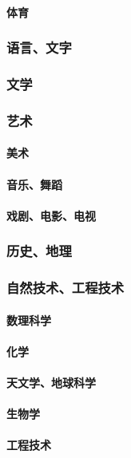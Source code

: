 \documentclass[UTF8]{../RepresentationUniverse}
\begin{document}
            \paragraph{体育}
        \subsubsection{语言、文字}
        \subsubsection{文学}
        \subsubsection{艺术}
            \paragraph{美术}
            \paragraph{音乐、舞蹈}
            \paragraph{戏剧、电影、电视}
        \subsubsection{历史、地理}
        \subsubsection{自然技术、工程技术}
            \paragraph{数理科学}
            \paragraph{化学}
            \paragraph{天文学、地球科学}
            \paragraph{生物学}
            \paragraph{工程技术}
\end{document}
